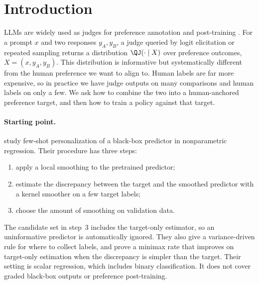 \section{Introduction}
\label{sec:intro}

LLMs are widely used as judges for preference annotation and post-training
\citep{bai2022constitutional,zheng2023judging,lee2024rlaif}. For a prompt $x$ and two responses
$y_A,y_B$, a judge queried by logit elicitation or repeated sampling returns a distribution
$\QJ(\cdot\mid X)$ over preference outcomes, $X=(x,y_A,y_B)$. This distribution is informative but
systematically different from the human preference we want to align to. Human labels are far more
expensive, so in practice we have judge outputs on many comparisons and human labels on only a
few. We ask how to combine the two into a human-anchored preference target, and then how to train a
policy against that target.

\paragraph{Starting point.}
\citet{li2026personalizing} study few-shot personalization of a black-box predictor in
nonparametric regression. Their procedure has three steps:
\begin{enumerate}
  \item apply a local smoothing to the pretrained predictor;
  \item estimate the discrepancy between the target and the smoothed predictor with a kernel
        smoother on a few target labels;
  \item choose the amount of smoothing on validation data.
\end{enumerate}
The candidate set in step~3 includes the target-only estimator, so an uninformative predictor is
automatically ignored. They also give a variance-driven rule for where to collect labels, and prove
a minimax rate that improves on target-only estimation when the discrepancy is simpler than the
target. Their setting is scalar regression, which includes binary classification. It does not
cover graded black-box outputs or preference post-training.

